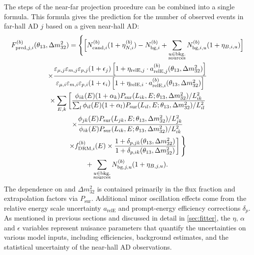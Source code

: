 The steps of the near-far projection procedure can be combined into a single formula.
This formula gives the prediction for the number of observed events
in far-hall AD $j$ based on a given near-hall AD:
\begin{multline}\label{eq:full_prediction}
    F_{\text{pred},j,i}^{(b)}(\theta_{13},\Delta m^2_{32}) =
    \Bigg\{
    \Big[N_{\text{cand},i}^{(b)}(1 + \eta_{N,i}^{(b)}) - N_{\text{bg},i}^{(b)}
          + \sum_{\substack{u \in \text{bkg.}\\\text{sources}}}
      N_{\text{bg},i,u}^{(b)}(1 + \eta_{B,i,u})\Big]\bigg. \\
    \times \frac{
        \varepsilon_{\mu,j}\varepsilon_{m,j}\varepsilon_{p,j}
        (1 + \epsilon_j)
        \left[1 + \eta_{\text{relE},j}\cdot a_{\text{relE},j}^{(b)}
            (\theta_{13},\Delta m^2_{32})\right]
    }{
        \varepsilon_{\mu,i}\varepsilon_{m,i}\varepsilon_{p,i}
        (1+\epsilon_i)
        \left[1 + \eta_{\text{relE},i}\cdot a_{\text{relE},i}^{(b)}
        (\theta_{13},\Delta m^2_{32})\right]
    } \\
    \bigg.
    \times \sum_{E,k} \left[
    \frac{
        \phi_{ik}(E)(1+\alpha_k) P_\text{sur} (L_{ik}, E;\theta_{13},\Delta m^2_{32})/L_{ik}^2
    }{
    \sum_l \phi_{il}(E)(1+\alpha_l)P_\text{sur}(L_{il}, E;\theta_{13},\Delta m^2_{32})/L_{il}^2
    } \right. \\
    \times \frac{
        \phi_{jk}(E)P_\text{sur}(L_{jk}, E;\theta_{13},\Delta m^2_{32})/L_{jk}^2}{
        \phi_{ik}(E)P_\text{sur}(L_{ik}, E;\theta_{13},\Delta m^2_{32})/L_{ik}^2
    } \\
        \left.\times f_{\text{DRM},i}^{(b)}(E)
    \times \frac{
        1 + \delta_{p,jk}(\theta_{13}, \Delta m^2_{32})
    }{
        1 + \delta_{p,ik}(\theta_{13}, \Delta m^2_{32})
    } \right] \Bigg\} \\
          + \sum_{\substack{u \in \text{bkg.}\\\text{sources}}}
        N_{\text{bg},j,u}^{(b)}(1 + \eta_{B,j,u}).
\end{multline}
The dependence on \thetaot{} and $\Delta m^2_{32}${}
is contained primarily in the flux fraction and extrapolation factors via $P_\text{sur}$.
Additional minor oscillation effects come from the relative energy scale uncertainty
$a_\text{relE}$ and prompt-energy efficiency corrections $\delta_p$.
As mentioned in previous sections and discussed in detail in \cref{sec:fitter},
the $\eta,\,\alpha$ and $\epsilon$ variables represent nuisance parameters
that quantify the uncertainties on various model inputs,
including efficiencies, background estimates,
and the statistical uncertainty of the near-hall AD observations.

